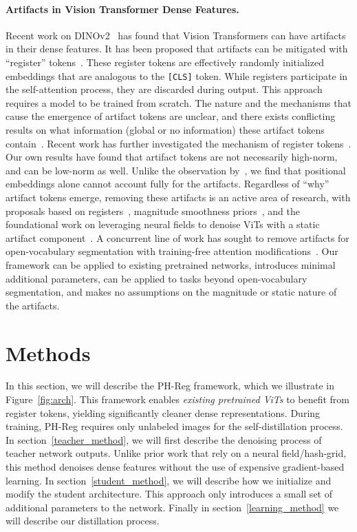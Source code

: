 \documentclass{article}
\newcommand{\myparagraph}[1]{\vspace{-2pt}\paragraph{#1}}
\begin{document}
\myparagraph{Artifacts in Vision Transformer Dense Features.} Recent work on DINOv2~\citep{oquab2023dinov2} has found that Vision Transformers can have artifacts in their dense features. It has been proposed that artifacts can be mitigated with ``register'' tokens~\citep{darcet2023vision,burtsev2020memory, xiao2023efficient, jiang2025vision}. These register tokens are effectively randomly initialized embeddings that are analogous to the \texttt{[CLS]} token. While registers participate in the self-attention process, they are discarded during output. This approach requires a model to be trained from scratch. The nature and the mechanisms that cause the emergence of artifact tokens are unclear, and there exists conflicting results on what information (global or no information) these artifact tokens contain~\citep{darcet2023vision,wang2024sinder}. Recent work has further investigated the mechanism of register tokens~\citep{lappe2025registerclstokensyield}. Our own results have found that artifact tokens are not necessarily high-norm, and can be low-norm as well. Unlike the observation by~\citep{yang2024denoising}, we find that positional embeddings alone cannot account fully for the artifacts. Regardless of ``why'' artifact tokens emerge, removing these artifacts is an active area of research, with proposals based on registers~\citep{darcet2023vision}, magnitude smoothness priors~\citep{wang2024sinder}, and the foundational work on leveraging neural fields to denoise ViTs with a static artifact component~\citep{yang2024denoising,yang2023emernerf, luo2024brain}. A concurrent line of work has sought to remove artifacts for open-vocabulary segmentation with training-free attention modifications~\citep{zhou2022extract, LI2025111409,wang2024scliprethinkingselfattentiondense,bousselham2023groundingeverythingemerginglocalization, lan2024clearclip, hajimiri2025naclip}. Our framework can be applied to existing pretrained networks, introduces  minimal additional parameters, can be applied to tasks beyond open-vocabulary segmentation, and makes no assumptions on the magnitude or static nature of the artifacts.
 \section{Methods}
\vspace{-.2cm}
In this section, we will describe the PH-Reg framework, which we illustrate in Figure~\ref{fig:arch}. This framework enables \emph{existing pretrained ViTs} to benefit from register tokens, yielding significantly cleaner dense representations. During training, PH-Reg requires only unlabeled images for the self-distillation process. In section~\ref{teacher_method}, we will first describe the denoising process of teacher network outputs. Unlike prior work that rely on a neural field/hash-grid, this method denoises dense features without the use of expensive gradient-based learning. In section~\ref{student_method}, we will describe how we initialize and modify the student architecture. This approach only introduces a small set of additional parameters to the network. Finally in section~\ref{learning_method} we will describe our distillation process. 
\end{document}
